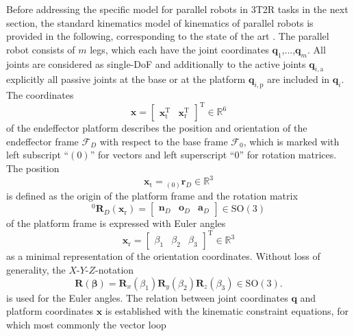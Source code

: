 \documentclass[robotics,article,submit,moreauthors,pdftex]{Definitions/mdpi}
\newcommand{\bm}[1]{\boldsymbol{#1}}
\newcommand{\ortvek}[4]{{ }_{(#1)}{\boldsymbol{#2}}^{#3}_{#4} }
\newcommand{\vek}[3]{\boldsymbol{#1}^{#2}_{#3}}
\newcommand{\rotmat}[2]{{{ }^{#1}\boldsymbol{R}}_{#2}}
\newcommand{\transp}[0]{{\mathrm{T}}}
\newcommand{\ks}[1]{{\mathcal{F}}_{#1}}
\begin{document}
Before addressing the specific model for parallel robots in 3T2R tasks in the next section, the standard kinematics model of kinematics of parallel robots is provided in the following, corresponding to the state of the art \cite{Merlet2006,Gogu2008,BriotKha2015}.
The parallel robot consists of $m$ legs, which each have the joint coordinates $\bm{q}_1$,...,$\bm{q}_m$.
All joints are considered as single-DoF and additionally to the active joints $\bm{q}_{i,\mathrm{a}}$ explicitly all passive joints at the base or at the platform $\bm{q}_{i,\mathrm{p}}$ are included in $\bm{q}_i$.
The coordinates
%
\begin{equation}
\bm{x}
=
\begin{bmatrix}
\bm{x}_{\mathrm{t}}^\transp & \bm{x}_{\mathrm{r}}^\transp
\end{bmatrix}^\transp
\in {\mathbb{R}}^{6}
\label{equ:x_def}
\end{equation}
%
of the endeffector platform describes the position and orientation of the endeffector frame  $\ks{D}$ with respect to the base frame $\ks{0}$, which is marked with left subscript ``$(0)$'' for vectors and left superscript ``$0$'' for rotation matrices.
The position 
%
\begin{equation}
\bm{x}_{\mathrm{t}}
=
\ortvek{0}{r}{}{D}
\in {\mathbb{R}}^{3}
\label{equ:xt_def}
\end{equation}  
%
is defined as the origin of the platform frame and the rotation matrix
%
\begin{equation}
\rotmat{0}{D} (\bm{x}_{\mathrm{r}})
=
\begin{bmatrix}\vek{n}{}{D} & \vek{o}{}{D} & \vek{a}{}{D}\end{bmatrix} \in \mathrm{SO(3)}
\label{equ:xr_def_rotmat}
\end{equation}
%
of the platform frame is expressed with Euler angles
%
\begin{equation}
\bm{x}_{\mathrm{r}}
=
\begin{bmatrix}
\beta_1  & \beta_2 & \beta_3
\end{bmatrix}^{\mathrm{T}}
\in {\mathbb{R}}^{3}
\label{equ:xr_def}
\end{equation} 
%
as a minimal representation of the orientation coordinates.
Without loss of generality, the $X$-$Y$-$Z$-notation
%
\begin{equation}
\bm{R}(\bm{\beta}) = \bm{R}_x(\beta_1) \bm{R}_y(\beta_2) \bm{R}_z(\beta_3) \in \mathrm{SO(3)}.
\label{equ:def_rmat_xyz}
\end{equation}
%
is used for the Euler angles.
%
The relation between joint coordinates $\bm{q}$ and platform coordinates $\bm{x}$ is established with the kinematic constraint equations, for which most commonly the vector loop
\end{document}
